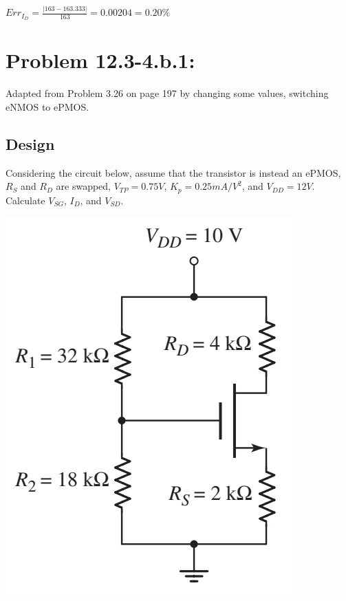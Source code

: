 \documentclass[12pt,letterpaper,titlepage]{article}
\begin{document}
\begin{raggedright}
\begin{center}
$Err_{I_D} = \frac{|163-163.333|}{163} = 0.00204 = 0.20\%$
\end{center}

\clearpage
\section{Problem 12.3-4.b.1: } Adapted from Problem 3.26 on page 197 by changing some values, switching eNMOS to ePMOS.
\subsection{Design}

Considering the circuit below, assume that the transistor is instead an ePMOS, $R_S$ and $R_D$ are swapped, $V_{TP} = 0.75V$, $K_p = 0.25 mA/V^2$, and $V_{DD} = 12V$. Calculate $V_{SG}$, $I_D$, and $V_{SD}$.

\begin{center}
\includegraphics[width=\textwidth, height=12\baselineskip, keepaspectratio=true]{ds2}
\end{center}


\end{raggedright}
\end{document}

